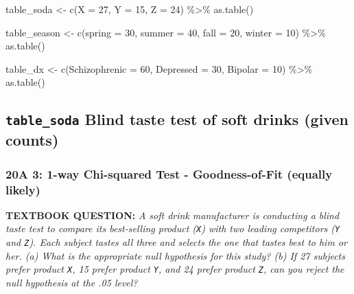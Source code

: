\documentclass[
]{article}
\newenvironment{Shaded}{\begin{snugshade}}{\end{snugshade}}
\newcommand{\AttributeTok}[1]{\textcolor[rgb]{0.77,0.63,0.00}{#1}}
\newcommand{\DecValTok}[1]{\textcolor[rgb]{0.00,0.00,0.81}{#1}}
\newcommand{\FunctionTok}[1]{\textcolor[rgb]{0.00,0.00,0.00}{#1}}
\newcommand{\NormalTok}[1]{#1}
\newcommand{\OtherTok}[1]{\textcolor[rgb]{0.56,0.35,0.01}{#1}}
\newcommand{\SpecialCharTok}[1]{\textcolor[rgb]{0.00,0.00,0.00}{#1}}
\begin{document}
\begin{Shaded}
\begin{Highlighting}[]
\NormalTok{table\_soda }\OtherTok{\textless{}{-}} \FunctionTok{c}\NormalTok{(}\AttributeTok{X =} \DecValTok{27}\NormalTok{, }
                \AttributeTok{Y =} \DecValTok{15}\NormalTok{, }
                \AttributeTok{Z =} \DecValTok{24}\NormalTok{) }\SpecialCharTok{\%\textgreater{}\%} 
  \FunctionTok{as.table}\NormalTok{()}

\NormalTok{table\_season }\OtherTok{\textless{}{-}} \FunctionTok{c}\NormalTok{(}\AttributeTok{spring =} \DecValTok{30}\NormalTok{, }
                  \AttributeTok{summer =} \DecValTok{40}\NormalTok{, }
                  \AttributeTok{fall   =} \DecValTok{20}\NormalTok{,}
                  \AttributeTok{winter =} \DecValTok{10}\NormalTok{) }\SpecialCharTok{\%\textgreater{}\%} 
  \FunctionTok{as.table}\NormalTok{()}

\NormalTok{table\_dx }\OtherTok{\textless{}{-}} \FunctionTok{c}\NormalTok{(}\AttributeTok{Schizophrenic =} \DecValTok{60}\NormalTok{, }
              \AttributeTok{Depressed     =} \DecValTok{30}\NormalTok{,}
              \AttributeTok{Bipolar       =} \DecValTok{10}\NormalTok{) }\SpecialCharTok{\%\textgreater{}\%} 
  \FunctionTok{as.table}\NormalTok{()}
\end{Highlighting}
\end{Shaded}

\clearpage

\hypertarget{table_soda-blind-taste-test-of-soft-drinks-given-counts}{%
\subsection{\texorpdfstring{\texttt{table\_soda} Blind taste test of
soft drinks (given
counts)}{table\_soda Blind taste test of soft drinks (given counts)}}\label{table_soda-blind-taste-test-of-soft-drinks-given-counts}}

\hypertarget{a-3-1-way-chi-squared-test---goodness-of-fit-equally-likely}{%
\subsubsection{20A 3: 1-way Chi-squared Test - Goodness-of-Fit (equally
likely)}\label{a-3-1-way-chi-squared-test---goodness-of-fit-equally-likely}}

\textbf{TEXTBOOK QUESTION:} \emph{A soft drink manufacturer is
conducting a blind taste test to compare its best-selling product
(\texttt{X}) with two leading competitors (\texttt{Y} and \texttt{Z}).
Each subject tastes all three and selects the one that tastes best to
him or her. (a) What is the appropriate null hypothesis for this study?
(b) If 27 subjects prefer product \texttt{X}, 15 prefer product
\texttt{Y}, and 24 prefer product \texttt{Z}, can you reject the null
hypothesis at the .05 level?}
\end{document}
